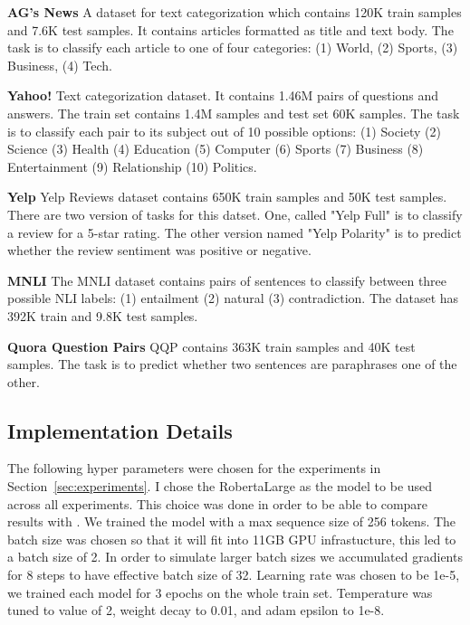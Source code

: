 \documentclass[11pt,a4paper]{article}
\begin{document}
\vspace{8pt}
\noindent \textbf{AG's News} \quad
A dataset for text categorization which contains 120K train samples and 7.6K test samples.
It contains articles formatted as title and text body.
The task is to classify each article to one of four categories: (1) World, (2) Sports, (3) Business, (4) Tech.

\vspace{8pt}
\noindent \textbf{Yahoo!} \quad
Text categorization dataset. It contains 1.46M pairs of questions and answers.
The train set contains 1.4M samples and test set 60K samples.
The task is to classify each pair to its subject out of 10 possible options: (1) Society (2) Science (3) Health (4) Education (5) Computer (6) Sports (7) Business (8) Entertainment (9) Relationship (10) Politics.

\vspace{8pt}
\noindent \textbf{Yelp} \quad
Yelp Reviews dataset contains 650K train samples and 50K test samples.
There are two version of tasks for this datset.
One, called "Yelp Full" is to classify a review for a 5-star rating.
The other version named "Yelp Polarity" is to predict whether the review sentiment was positive or negative.

\vspace{8pt}
\noindent \textbf{MNLI} \quad
The MNLI dataset contains pairs of sentences to classify between three possible NLI labels: (1) entailment (2) natural (3) contradiction. 
The dataset has 392K train and 9.8K test samples.

\vspace{8pt}
\noindent \textbf{Quora Question Pairs} \quad
QQP contains 363K train samples and 40K test samples.
The task is to predict whether two sentences are paraphrases one of the other.

\subsection{Implementation Details}
\label{apx:implementation-details}
The following hyper parameters were chosen for the experiments in Section~\ref{sec:experiments}.
I chose the RobertaLarge as the model to be used across all experiments.
This choice was done in order to be able to compare results with \citet{schick2020exploiting}.
We trained the model with a max sequence size of 256 tokens.
The batch size was chosen so that it will fit into 11GB GPU infrastucture, this led to a batch size of 2. 
In order to simulate larger batch sizes we accumulated gradients for 8 steps to have effective batch size of 32.
Learning rate was chosen to be 1e-5, we trained each model for 3 epochs on the whole train set.
Temperature was tuned to value of 2, weight decay to 0.01, and adam epsilon to 1e-8.
\end{document}
